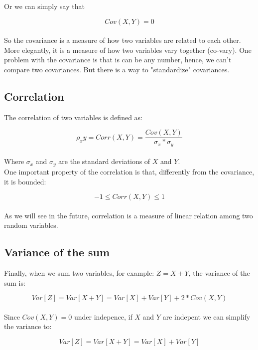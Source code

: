 \documentclass[11pt]{article}
\begin{document}
	Or we can simply say that

	\[Cov(X,Y) = 0\]\\

	So the covariance is a measure of how two variables are related to each other. More elegantly, it is a measure of how two variables vary together (co-vary). One problem with the covariance is that is can be any number, hence, we can't compare two covariances. But there is a way to "standardize" covariances.

	\subsection*{Correlation}

	The correlation of two variables is defined as:

	\[\rho_xy = Corr(X,Y) = \frac{Cov(X,Y)}{\sigma_x*\sigma_y} \]\\

	Where $\sigma_x$ and $\sigma_y$ are the standard deviations of $X$ and $Y$.\\

	One important property of the correlation is that, differently from the covariance, it is bounded:

	\[ -1 \leq Corr(X,Y) \leq 1\]\\

	As we will see in the future, correlation is a measure of linear relation among two random variables.

	\subsection*{Variance of the sum}

	Finally, when we sum two variables, for example: $Z=X+Y$, the variance of the sum is:

	\[Var[Z] = Var[X+Y] = Var[X] + Var[Y] + 2*Cov(X,Y)\]\\

	Since $Cov(X,Y) = 0$ under indepence, if $X$ and $Y$ are indepent we can simplify the variance to:

	\[Var[Z] = Var[X+Y] = Var[X] + Var[Y]\]
\end{document}
